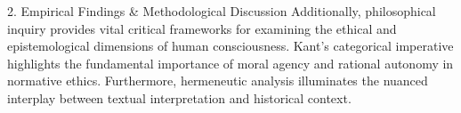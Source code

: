 2. Empirical Findings & Methodological Discussion
Additionally, philosophical inquiry provides vital critical frameworks for examining the ethical and epistemological dimensions of human consciousness. Kant's categorical imperative highlights the fundamental importance of moral agency and rational autonomy in normative ethics. Furthermore, hermeneutic analysis illuminates the nuanced interplay between textual interpretation and historical context.